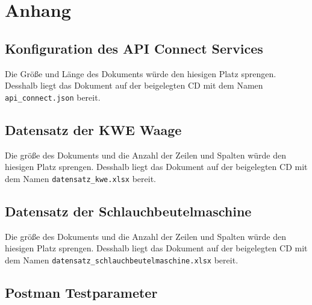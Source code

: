 \chapter{Anhang}
\label{ch:anhang}

\section{Konfiguration des API Connect Services}
\label{sec:konfigurationAPIConnect}
Die Größe und Länge des Dokuments würde den hiesigen Platz sprengen. Desshalb liegt das Dokument auf der beigelegten CD
mit dem Namen \texttt{api\_connect.json} bereit.

\section{Datensatz der KWE Waage}
\label{sec:scaleData}
Die größe des Dokuments und die Anzahl der Zeilen und Spalten würde den hiesigen Platz sprengen. Desshalb liegt das
Dokument auf der beigelegten CD mit dem Namen \texttt{datensatz\_kwe.xlsx} bereit.

\section{Datensatz der Schlauchbeutelmaschine}
\label{sec:schlauchbeutelmaschine}
Die größe des Dokuments und die Anzahl der Zeilen und Spalten würde den hiesigen Platz sprengen. Desshalb liegt das
Dokument auf der beigelegten CD mit dem Namen \texttt{datensatz\_schlauchbeutelmaschine.xlsx} bereit.

\newpage

\section{Postman Testparameter}
\label{sec:postmanTestparameter}

